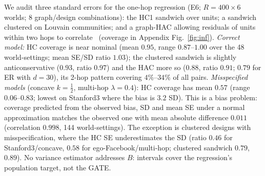 We audit three standard errors for the one-hop regression (E6; $R=400\times6$ worlds; 8 graph/design combinations): the HC1 sandwich over units; a sandwich clustered on Louvain communities; and a graph-HAC allowing residuals of units within two hops to correlate~\citep{kojevnikov2021limit} (coverage in Appendix Fig.~\ref{fig:inf}). \emph{Correct model:} HC coverage is near nominal (mean $0.95$, range $0.87$--$1.00$ over the 48 world-settings; mean SE/SD ratio $1.03$); the clustered sandwich is slightly anticonservative ($0.93$, ratio $0.97$) and the HAC more so ($0.88$, ratio $0.91$; $0.79$ for ER with $d=30$), its 2-hop pattern covering $4\%$--$34\%$ of all pairs. \emph{Misspecified models} (concave $k=\frac12$, multi-hop $\lambda=0.4$): HC coverage has mean $0.57$ (range $0.06$--$0.83$; lowest on Stanford3 where the bias is $3.2$ SD). This is a bias problem: coverage predicted from the observed bias, SD and mean SE under a normal approximation matches the observed one with mean absolute difference $0.011$ (correlation $0.998$, 144 world-settings). The exception is clustered designs with misspecification, where the HC SE underestimates the SD (ratio $0.46$ for Stanford3/concave, $0.58$ for ego-Facebook/multi-hop; clustered sandwich $0.79$, $0.89$). No variance estimator addresses $B$: intervals cover the regression's population target, not the GATE.

